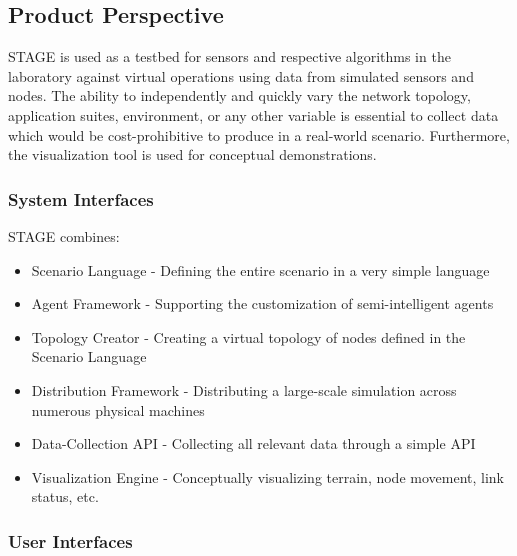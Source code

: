 \documentclass[titlepage]{article}
\begin{document}

\subsection{Product Perspective%
  \label{product-perspective}%
}

STAGE is used as a testbed for sensors and respective algorithms in the laboratory against virtual operations using data from simulated sensors and nodes. The ability to independently and quickly vary the network topology, application suites, environment, or any other variable is essential to collect data which would be cost-prohibitive to produce in a real-world scenario. Furthermore, the visualization tool is used for conceptual demonstrations.


\subsubsection{System Interfaces%
  \label{system-interfaces}%
}

STAGE combines:
\begin{itemize}
    \item Scenario Language - Defining the entire scenario in a very simple language
    \item Agent Framework - Supporting the customization of semi-intelligent agents
    \item Topology Creator - Creating a virtual topology of nodes defined in the Scenario Language
    \item Distribution Framework - Distributing a large-scale simulation across numerous physical machines
    \item Data-Collection API - Collecting all relevant data through a simple API
    \item Visualization Engine - Conceptually visualizing terrain, node movement, link status, etc.
\end{itemize}


\subsubsection{User Interfaces%
  \label{user-interfaces}%
}
\end{document}
